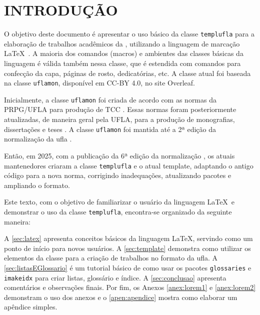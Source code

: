 \chapter{\MakeUppercase{Introdução}}

O objetivo deste documento é apresentar o uso básico da classe \texttt{templufla} para a elaboração de trabalhos acadêmicos da , utilizando a linguagem de marcação \LaTeX\ \cite[ p.17]{Lamport1994}. A maioria dos comandos (macros) e ambientes das classes básicas da linguagem é válida também nessa classe, que é estendida com comandos para confecção da capa, páginas de rosto, dedicatórias, etc. A classe atual foi baseada na classe \texttt{uflamon}, disponível em CC-BY 4.0, no site Overleaf.

Inicialmente, a classe \texttt{uflamon} foi criada de acordo com as normas da PRPG/UFLA para produção de TCC \cite{PRPG2006}. Essas normas foram posteriormente atualizadas, de maneira geral pela UFLA, para a produção de monografias, dissertações e teses \cite{BIB2010}. A classe \texttt{uflamon} foi mantida até a 2ª edição da normalização da \gls{ufla} \cite{UFLA:2015}.

Então, em 2025, com a publicação da 6ª edição da normalização \cite{UFLA:2025}, os atuais mantenedores criaram a classe \texttt{templufla} e o atual template, adaptando o antigo código para a nova norma, corrigindo inadequações, atualizando pacotes e ampliando o formato.

Este texto, com o objetivo de familiarizar o usuário da linguagem \LaTeX\ e demonstrar o uso da classe \texttt{templufla}, encontra-se organizado da seguinte maneira: 

A \autoref{sec:latex} apresenta conceitos básicos da linguagem \LaTeX, servindo como um ponto de início para novos usuários. 
A \autoref{sec:template} demonstra como utilizar os elementos da classe para a criação de trabalhos no formato da \gls{ufla}.
A \autoref{sec:listasEGlossario} é um tutorial básico de como usar os pacotes \texttt{glossaries} e \texttt{imakeidx} para criar listas, glossário e índice. 
A \autoref{sec:conclusao} apresenta comentários e observações finais.
Por fim, os Anexos \ref{anex:lorem1} e \ref{anex:lorem2} demonstram o uso dos anexos e o \autoref{apen:apendice} mostra como elaborar um apêndice simples.